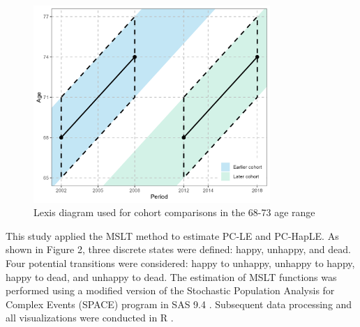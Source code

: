 \documentclass[12pt, a4paper]{article}
\begin{document}
\begin{figure}[htbp]
  \centering
  \includegraphics[width=0.8\textwidth]{fig_tabs_b300/2_1_Lexis_Diagram.png}
  \caption{Lexis diagram used for cohort comparisons in the 68-73 age range}
  \label{fig:Lexis_Diagram}
\end{figure}

This study applied the MSLT method to estimate PC-LE and PC-HapLE. As shown in Figure 2, three discrete states were defined: happy, unhappy, and dead. Four potential transitions were considered: happy to unhappy, unhappy to happy, happy to dead, and unhappy to dead. The estimation of MSLT functions was performed using a modified version of the Stochastic Population Analysis for Complex Events (SPACE) program \autocite{cai.2010.estimation} in SAS 9.4 \autocite{sasinstituteinc..2016.sas}. Subsequent data processing and all visualizations were conducted in R \autocite{rcoreteam.2023.language}.
\end{document}
